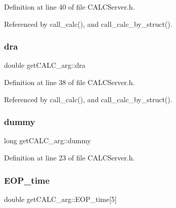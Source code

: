 Definition at line 40 of file C\+A\+L\+C\+Server.\+h.



Referenced by call\+\_\+calc(), and call\+\_\+calc\+\_\+by\+\_\+struct().

\mbox{\label{structget_c_a_l_c__arg_a90ced3de8d8a66c10d771aee7af0fb3a}} 
\subsubsection{\texorpdfstring{dra}{dra}}
{\footnotesize\ttfamily double get\+C\+A\+L\+C\+\_\+arg\+::dra}



Definition at line 38 of file C\+A\+L\+C\+Server.\+h.



Referenced by call\+\_\+calc(), and call\+\_\+calc\+\_\+by\+\_\+struct().

\mbox{\label{structget_c_a_l_c__arg_ab19e601597ca490661b92ea63a4d0d97}} 
\subsubsection{\texorpdfstring{dummy}{dummy}}
{\footnotesize\ttfamily long get\+C\+A\+L\+C\+\_\+arg\+::dummy}



Definition at line 23 of file C\+A\+L\+C\+Server.\+h.

\mbox{\label{structget_c_a_l_c__arg_adcbab6f6a4b0d43a17ff83b052270a85}} 
\subsubsection{\texorpdfstring{E\+O\+P\+\_\+time}{EOP\_time}}
{\footnotesize\ttfamily double get\+C\+A\+L\+C\+\_\+arg\+::\+E\+O\+P\+\_\+time\mbox{[}5\mbox{]}}



